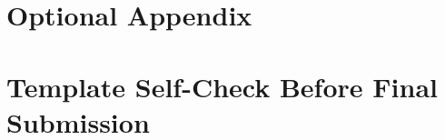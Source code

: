 \documentclass[11pt,a4paper]{article}
\newif\ifdraftinstructions
\newcommand{\instruction}[1]{%
  \ifdraftinstructions
    \begin{instructionbox}[title=What to write here]
      \small\color{SecondaryText}#1
    \end{instructionbox}
  \fi
}
\begin{document}
\section{Optional Appendix}
\instruction{Use the appendix only for supporting material that is useful for auditability but not essential to the main argument: additional confusion matrices, parameter grids, supplementary plots, or compact implementation notes. The appendix does not compensate for missing interpretation in the main report. Delete this appendix if it is not needed.}


\ifdraftinstructions
\clearpage
\section*{Template Self-Check Before Final Submission}
\end{document}
